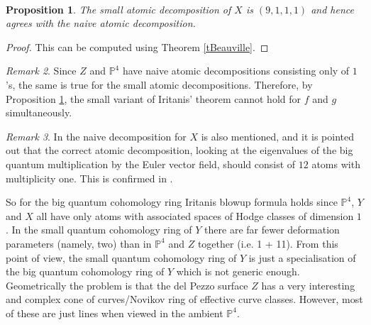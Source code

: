 \documentclass[11pt]{amsart}
\theoremstyle{plain}
\newtheorem{theorem}{Theorem}[section]
\newtheorem{proposition}[theorem]{Proposition}
\numberwithin{equation}{section}
\theoremstyle{definition}
\theoremstyle{remark}
\newtheorem{remark}[theorem]{Remark}
\renewcommand{\P}{\mathbb P}
\begin{document}
\





\begin{proposition}\label{pSmallIritaniQuadrics}
The small atomic decomposition of $X$ is $(9,1,1,1)$ and hence agrees with the naive atomic decomposition. 
\end{proposition}

\begin{proof}
This can be computed using Theorem \ref{tBeauville}. 
\end{proof}

\begin{remark}\label{rSmall}
Since $Z$ and $\P^4$ have naive atomic decompositions consisting only of $1$'s, the same is true for the small atomic decompositions. Therefore, by Proposition \ref{pSmallIritaniQuadrics}, the small variant of Iritanis' theorem cannot hold for $f$ and $g$ simultaneously.
\end{remark}


\begin{remark}\label{rExplanationBigSmall}
In \cite[Example 2.13]{CKK25} the naive decomposition for $X$ is also mentioned, and it is pointed out that the correct atomic decomposition, looking at the eigenvalues of the big quantum multiplication by the Euler vector field, should consist of $12$ atoms with multiplicity one. This is confirmed in \cite{Hu21}. 

So for the big quantum cohomology ring Iritanis blowup formula holds since $\P^4$, $Y$ and $X$ all have only atoms with associated spaces of Hodge classes of dimension $1$. In the small quantum cohomology ring of $Y$ there are far fewer deformation parameters (namely, two) than in $\P^4$ and $Z$ together (i.e. 1 + 11). From this point of view, the small quantum cohomology ring of $Y$ is just a specialisation of the big quantum cohomology ring of $Y$ which is not generic enough. Geometrically the problem is that the del Pezzo surface $Z$ has a very interesting and complex cone of curves/Novikov ring of effective curve classes. However, most of these are just lines when viewed in the ambient $\P^4$. 
\end{remark}
\end{document}
